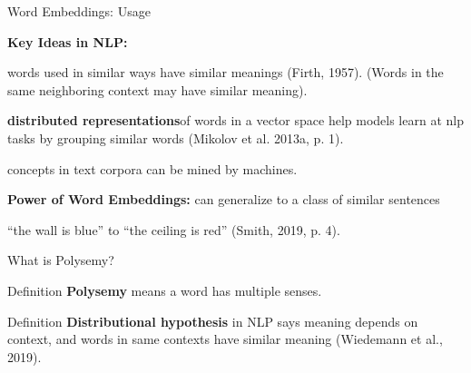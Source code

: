 \begin{frame}{Word Embeddings: Usage}

\textbf{Key Ideas in NLP:} 

\begin{itemizeSpaced}{7pt}
    \item words used in similar ways have similar meanings (Firth, 1957). (Words in the same neighboring context may have similar meaning). 
    
    \begin{itemizeSpaced}{0pt}
        \item \textbf{distributed representations}\footnotemark of words in a vector space help models learn at  nlp tasks by grouping similar words (Mikolov et al. 2013a, p. 1).

    \end{itemizeSpaced}
    
    \item concepts in text corpora can be mined by machines.
    
    \item \textbf{Power of Word Embeddings:} can generalize to a class of similar sentences

    \begin{itemizeSpaced}{0pt}
        \item ``the wall is blue” to ``the ceiling is red” (Smith, 2019, p. 4).
    \end{itemizeSpaced}    

    
\end{itemizeSpaced}


\end{frame}





\begin{frame}{What is Polysemy?}
    
    \begin{definitionBlock}{Definition}
    \alert{\textbf{Polysemy}} means a word has multiple senses. 
    \end{definitionBlock}
    
    
    \begin{definitionBlock}{Definition}
    \alert{\textbf{Distributional hypothesis}} in NLP says meaning depends on context, and words in same contexts have similar meaning (Wiedemann et al., 2019). 
    \end{definitionBlock}
\end{frame}


